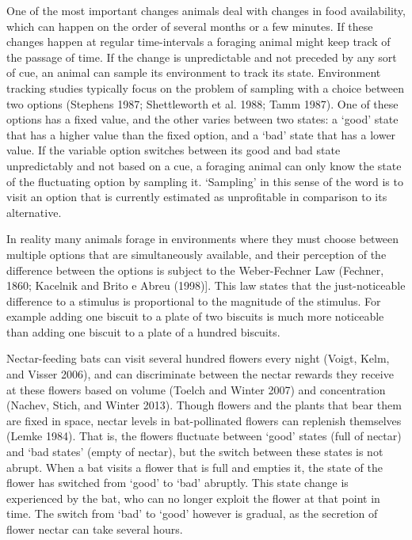 \documentclass[
]{article}
\begin{document}
One of the most important changes animals deal with changes in food availability, which can happen on the order of several months or a few minutes. If these changes happen at regular time-intervals a foraging animal might keep track of the passage of time. If the change is unpredictable and not preceded by any sort of cue, an animal can sample its environment to track its state. Environment tracking studies typically focus on the problem of sampling with a choice between two options (Stephens 1987; Shettleworth et al. 1988; Tamm 1987). One of these options has a fixed value, and the other varies between two states: a `good' state that has a higher value than the fixed option, and a `bad' state that has a lower value. If the variable option switches between its good and bad state unpredictably and not based on a cue, a foraging animal can only know the state of the fluctuating option by sampling it. `Sampling' in this sense of the word is to visit an option that is currently estimated as unprofitable in comparison to its alternative.

In reality many animals forage in environments where they must choose between multiple options that are simultaneously available, and their perception of the difference between the options is subject to the Weber-Fechner Law (Fechner, 1860; Kacelnik and Brito e Abreu (1998){]}. This law states that the just-noticeable difference to a stimulus is proportional to the magnitude of the stimulus. For example adding one biscuit to a plate of two biscuits is much more noticeable than adding one biscuit to a plate of a hundred biscuits.

Nectar-feeding bats can visit several hundred flowers every night (Voigt, Kelm, and Visser 2006), and can discriminate between the nectar rewards they receive at these flowers based on volume (Toelch and Winter 2007) and concentration (Nachev, Stich, and Winter 2013). Though flowers and the plants that bear them are fixed in space, nectar levels in bat-pollinated flowers can replenish themselves (Lemke 1984). That is, the flowers fluctuate between `good' states (full of nectar) and `bad states' (empty of nectar), but the switch between these states is not abrupt. When a bat visits a flower that is full and empties it, the state of the flower has switched from `good' to `bad' abruptly. This state change is experienced by the bat, who can no longer exploit the flower at that point in time. The switch from `bad' to `good' however is gradual, as the secretion of flower nectar can take several hours.
\end{document}

